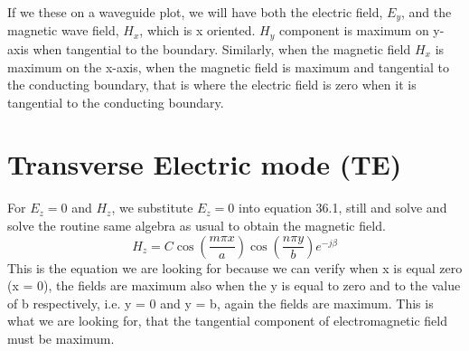 If we these on a waveguide plot, we will have both the electric field, $E_{y}$, and the magnetic wave field, $H_{x}$, which is x oriented. $H_{y}$ component is maximum on y-axis when tangential to the boundary. Similarly, when the magnetic field $H_{x}$ is maximum on the x-axis, when the magnetic field is maximum and tangential to the conducting boundary, that is where the electric field is zero when it is tangential to the conducting boundary.
\section{Transverse Electric mode (TE)}
For $E_{z} = 0$ and $H_{z}$, we substitute $E_{z} = 0$ into equation 36.1, still and solve and solve the routine same algebra as usual to obtain the magnetic field.
\begin{equation}
H_{z} = C \cos (\frac{m\pi x}{a})\cos (\frac{n\pi y}{b})e^{-j\beta}
\end{equation}
This is the equation we are looking for because we can verify when x is equal zero (x = 0), the fields are maximum also when the y is equal to zero and to the value of b respectively, i.e. y = 0 and y = b, again the fields  are maximum. This is what we are looking for, that the tangential component of electromagnetic field must be maximum.


